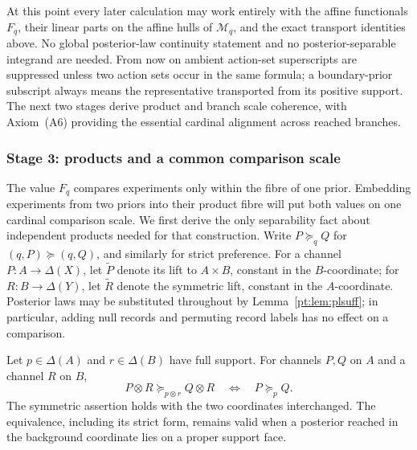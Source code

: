 At this point every later calculation may work entirely with the affine
functionals $F_q$, their linear parts on the affine hulls of
$\mathcal M_q$, and the exact transport identities above.  No global
posterior-law continuity statement and no posterior-separable integrand are
needed.  From now on ambient action-set superscripts are suppressed unless
two action sets occur in the same formula; a boundary-prior subscript always
means the representative transported from its positive support.  The next two
stages derive product and branch scale coherence, with
Axiom~\textup{(A6)} providing the essential cardinal alignment across reached
branches.

\subsubsection{Stage 3: products and a common comparison scale}

The value $F_q$ compares experiments only within the fibre of one prior.
Embedding experiments from two priors into their product fibre will put both
values on one cardinal comparison scale.  We first derive the only
separability fact about independent products needed for that construction.
Write $P\succeq_qQ$ for $(q,P)\succeq(q,Q)$, and similarly for strict
preference.  For a channel $P:A\to\Delta(X)$, let $\widetilde P$ denote its
lift to $A\times B$, constant in the $B$-coordinate; for
$R:B\to\Delta(Y)$, let $\widetilde R$ denote the symmetric lift, constant in
the $A$-coordinate.
Posterior laws may be substituted throughout by Lemma~\ref{pt:lem:plsuff};
in particular, adding null records and permuting record labels has no effect
on a comparison.

\begin{lemma}
\label{pt:lem:background}
Let $p\in\Delta(A)$ and $r\in\Delta(B)$ have full support.  For channels
$P,Q$ on $A$ and a channel $R$ on $B$,
\begin{equation}
 P\otimes R\succeq_{p\otimes r}Q\otimes R
 \quad\Longleftrightarrow\quad
 P\succeq_p Q .
\tag{BI}\label{pt:eq:backgroundinert}
\end{equation}
The symmetric assertion holds with the two coordinates interchanged.  The
equivalence, including its strict form, remains valid when a posterior reached
in the background coordinate lies on a proper support face.
\end{lemma}

